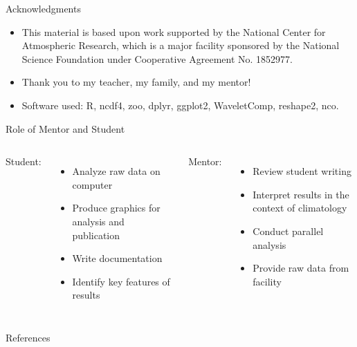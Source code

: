 \documentclass{beamer}
\begin{document}
\begin{frame}
  \vfill

  \begin{block}{Acknowledgments}
    \begin{itemize}
    \item This material is based upon work supported by the National Center for Atmospheric Research, which is a major facility sponsored by the National Science Foundation under Cooperative Agreement No. 1852977.
    \item Thank you to my teacher, my family, and my mentor!
    \item Software used: R, ncdf4, zoo, dplyr, ggplot2, WaveletComp, reshape2, nco.
    \end{itemize}
  \end{block}

  \vfill

  \begin{block}{Role of Mentor and Student}
    \begin{columns}[t]
      Student:
      \begin{itemize}
      \item Analyze raw data on computer
      \item Produce graphics for analysis and publication
      \item Write documentation
      \item Identify key features of results
      \end{itemize}
      Mentor:
      \begin{itemize}
      \item Review student writing
      \item Interpret results in the context of climatology
      \item Conduct parallel analysis
      \item Provide raw data from facility
      \end{itemize}
    \end{columns}
  \end{block}

  \vfill

  \begin{block}{References}
    
    \scriptsize{}
  \end{block}

  \vfill

\end{frame}
\end{document}
